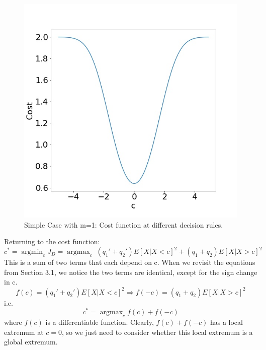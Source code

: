 \documentclass{article}
\DeclareMathOperator*{\argmin}{argmin}
\DeclareMathOperator*{\argmax}{argmax}
\begin{document}
\begin{figure}[H]
\begin{center}
\includegraphics[scale=0.24]{simple_cost.jpg}
\end{center}
\caption{Simple Case with m=1: Cost function at different decision rules.}
\label{fig:simple_cost}
\end{figure}

Returning to the cost function:
\[ c^* = \argmin_c J_D = \argmax_c \; (q_1'+q_2')E[X|X<c]^2 + (q_1+q_2)E[X|X>c]^2\]
This is a sum of two terms that each depend on c. When we revisit the equations from Section 3.1, we notice the two terms are identical, except for the sign change in c. 
\[ f(c) = (q_1'+q_2')E[X|X<c]^2 \Rightarrow f(-c) =  (q_1+q_2)E[X|X>c]^2\]
i.e.
\[ c^* = \argmax_c f(c) + f(-c)\]
where $f(c)$ is a differentiable function. Clearly, $f(c) + f(-c)$ has a local extremum at $c=0$, so we just need to consider whether this local extremum is a global extremum.
\end{document}
